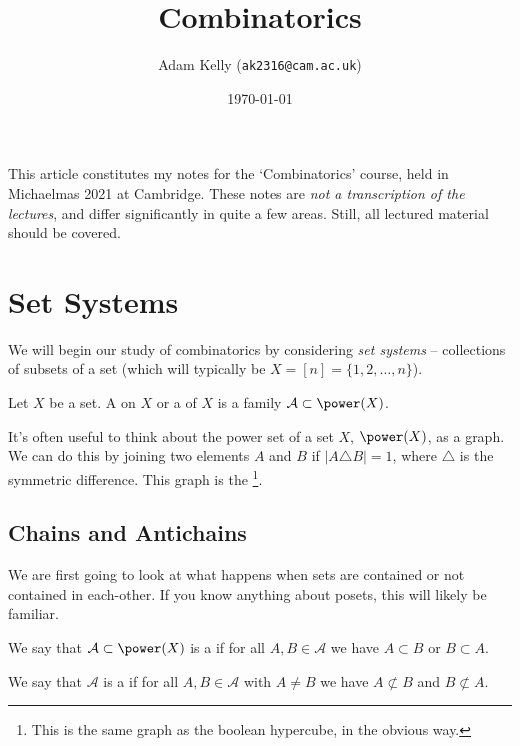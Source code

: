 \documentclass[a4paper]{scrartcl}
\title{Combinatorics}
\author{Adam Kelly (\texttt{ak2316@cam.ac.uk})}
\date{\today}
\newcommand{\A}{\mathcal{A}}
\begin{document}
\maketitle


This article constitutes my notes for the `Combinatorics' course, held in Michaelmas 2021 at Cambridge. These notes are \emph{not a transcription of the lectures}, and differ significantly in quite a few areas. Still, all lectured material should be covered.



\tableofcontents



\section{Set Systems}
 
We will begin our study of combinatorics by considering \emph{set systems} -- collections of subsets of a set (which will typically be $X = [n] = \{1, 2, \dots, n\}$).

\begin{definition}
Let $X$ be a set. A  on $X$ or a  of $X$ is a family $\A \subset \power(X)$.
\end{definition}

It's often useful to think about the power set of a set $X$, $\power(X)$, as a graph. We can do this by joining two elements $A$ and $B$ if $|A \triangle B| = 1$, where $\triangle$ is the symmetric difference.
This graph is the \footnote{This is the same graph as the boolean hypercube, in the obvious way.}.


\subsection{Chains and Antichains}

We are first going to look at what happens when sets are contained or not contained in each-other. If you know anything about posets, this will likely be familiar. 

\begin{definition}
We say that $\A \subset \power(X)$ is a  if for all $A, B \in \A$ we have $A \subset B$ or $B \subset A$.

We say that $\A$ is a  if for all $A, B \in \A$ with $A \neq B$ we have $A \not \subset B$ and $B \not \subset A$.
\end{definition}
\end{document}
